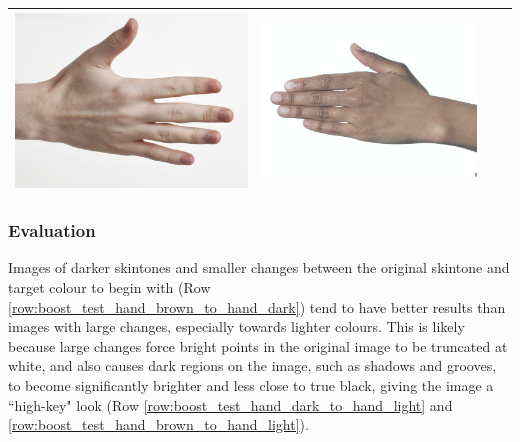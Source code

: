 \documentclass[12pt, a4paper]{article}
\begin{document}
\begin{longtable}{|c||c|c|c|}
\begin{minipage}{.29\textwidth}
    \includegraphics[width=\textwidth,height=\textheight,keepaspectratio]{../inputs/hand_pale.jpg}
  \end{minipage} & 
  \begin{minipage}{.29\textwidth}
    \includegraphics[width=\textwidth,height=\textheight,keepaspectratio]{../rc_test/outputs/20170516_boost_test/hand_brown_to_hand_pale.jpg}
  \end{minipage} \\
    \hline
\end{longtable}

\subsubsection*{Evaluation}
Images of darker skintones and smaller changes between the original skintone and target colour to begin with (Row \ref{row:boost_test_hand_brown_to_hand_dark}) tend to have better results than images with large changes, especially towards lighter colours. This is likely because large changes force bright points in the original image to be truncated at white, and also causes dark regions on the image, such as shadows and grooves, to become significantly brighter and less close to true black, giving the image a ``high-key" look (Row \ref{row:boost_test_hand_dark_to_hand_light} and \ref{row:boost_test_hand_brown_to_hand_light}).
\end{document}
